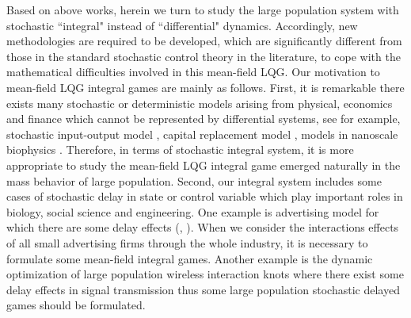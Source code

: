 \documentclass[11pt]{article}
\begin{document}
Based on above works, herein we turn to study
the large population system with stochastic ``integral" instead of
``differential" dynamics. Accordingly, new methodologies are
required to be developed, which are significantly different from
those in the standard stochastic control theory in the literature,
to cope with the mathematical difficulties involved in this
mean-field LQG. Our motivation to mean-field LQG integral games are
mainly as follows.
 First, it is remarkable there exists many stochastic or deterministic models arising from physical,
economics and finance which cannot be represented by differential
systems, see for example, stochastic input-output model \cite{D-H
1986}, capital replacement model \cite{K-M 1976}, models in
nanoscale biophysics \cite{K 2008}. Therefore,
 in terms of stochastic integral system, it is more appropriate to study the
  mean-field LQG integral game emerged naturally in the mass behavior of
  large population. Second, our integral system includes some cases of stochastic delay
in state or control variable which play important roles in biology,
social science and engineering. One example is advertising model for
which there are some delay effects (\cite{G-M 2006}, \cite{G-M-S
2009}). When we consider the interactions effects of all small
advertising firms through the whole industry, it is necessary to
formulate some mean-field integral games. Another example is the
dynamic optimization of large population wireless interaction knots
where there exist some delay effects in signal transmission thus
some large population stochastic delayed games should be formulated.
\end{document}
